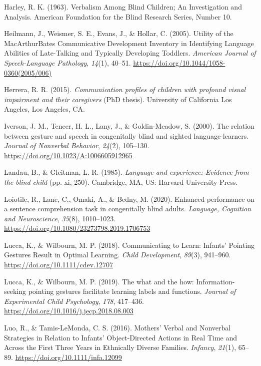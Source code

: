 \documentclass[english,man,floatsintext]{apa6}
\begin{document}
\leavevmode\hypertarget{ref-harley1963}{}%
Harley, R. K. (1963). Verbalism Among Blind Children; An Investigation and Analysis. American Foundation for the Blind Research Series, Number 10.

\leavevmode\hypertarget{ref-heilmann2005}{}%
Heilmann, J., Weismer, S. E., Evans, J., \& Hollar, C. (2005). Utility of the MacArthurBates Communicative Development Inventory in Identifying Language Abilities of Late-Talking and Typically Developing Toddlers. \emph{American Journal of Speech-Language Pathology}, \emph{14}(1), 40--51. \url{https://doi.org/10.1044/1058-0360(2005/006)}

\leavevmode\hypertarget{ref-herrera2015}{}%
Herrera, R. R. (2015). \emph{Communication profiles of children with profound visual impairment and their caregivers} (PhD thesis). University of California Los Angeles, Los Angeles, CA.

\leavevmode\hypertarget{ref-iverson2000}{}%
Iverson, J. M., Tencer, H. L., Lany, J., \& Goldin-Meadow, S. (2000). The relation between gesture and speech in congenitally blind and sighted language-learners. \emph{Journal of Nonverbal Behavior}, \emph{24}(2), 105--130. \url{https://doi.org/10.1023/A:1006605912965}

\leavevmode\hypertarget{ref-landau1985}{}%
Landau, B., \& Gleitman, L. R. (1985). \emph{Language and experience: Evidence from the blind child} (pp. xi, 250). Cambridge, MA, US: Harvard University Press.

\leavevmode\hypertarget{ref-loiotile2020}{}%
Loiotile, R., Lane, C., Omaki, A., \& Bedny, M. (2020). Enhanced performance on a sentence comprehension task in congenitally blind adults. \emph{Language, Cognition and Neuroscience}, \emph{35}(8), 1010--1023. \url{https://doi.org/10.1080/23273798.2019.1706753}

\leavevmode\hypertarget{ref-lucca2018}{}%
Lucca, K., \& Wilbourn, M. P. (2018). Communicating to Learn: Infants' Pointing Gestures Result in Optimal Learning. \emph{Child Development}, \emph{89}(3), 941--960. \url{https://doi.org/10.1111/cdev.12707}

\leavevmode\hypertarget{ref-lucca2019}{}%
Lucca, K., \& Wilbourn, M. P. (2019). The what and the how: Information-seeking pointing gestures facilitate learning labels and functions. \emph{Journal of Experimental Child Psychology}, \emph{178}, 417--436. \url{https://doi.org/10.1016/j.jecp.2018.08.003}

\leavevmode\hypertarget{ref-luo2016}{}%
Luo, R., \& Tamis-LeMonda, C. S. (2016). Mothers' Verbal and Nonverbal Strategies in Relation to Infants' Object-Directed Actions in Real Time and Across the First Three Years in Ethnically Diverse Families. \emph{Infancy}, \emph{21}(1), 65--89. \url{https://doi.org/10.1111/infa.12099}
\end{document}
